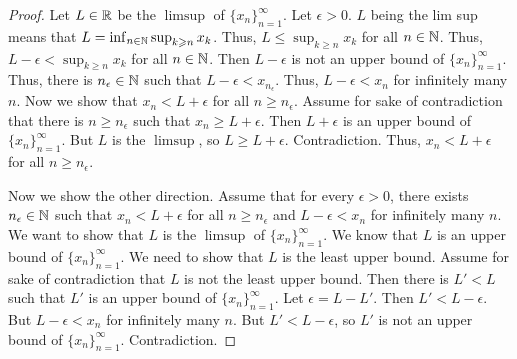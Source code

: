 \documentclass{report}
\begin{document}
\begin{proof}
    Let $L \in \RR$ be the $\limsup$ of $\{x_n\}_{n=1}^\infty$. Let $\epsilon > 0$. $L$ being the lim sup means that $L = \inf_{n \in \NN}\sup_{k \geq n} x_k$. Thus, $L \leq \sup_{k \geq n} x_k$ for all $n \in \NN$. Thus, $L - \epsilon < \sup_{k \geq n} x_k$ for all $n \in \NN$. Then $L - \epsilon$ is not an upper bound of $\{x_n\}_{n=1}^\infty$. Thus, there is $n_\epsilon \in \NN$ such that $L - \epsilon < x_{n_\epsilon}$. Thus, $L - \epsilon < x_n$ for infinitely many $n$. Now we show that $x_n < L + \epsilon$ for all $n \geq n_\epsilon$. Assume for sake of contradiction that there is $n \geq n_\epsilon$ such that $x_n \geq L + \epsilon$. Then $L + \epsilon$ is an upper bound of $\{x_n\}_{n=1}^\infty$. But $L$ is the $\limsup$, so $L \geq L + \epsilon$. Contradiction. Thus, $x_n < L + \epsilon$ for all $n \geq n_\epsilon$.

    Now we show the other direction. Assume that for every $\epsilon > 0$, there exists $n_\epsilon \in \NN$ such that $x_n < L + \epsilon$ for all $n \geq n_\epsilon$ and $L - \epsilon < x_n$ for infinitely many $n$. We want to show that $L$ is the $\limsup$ of $\{x_n\}_{n=1}^\infty$. We know that $L$ is an upper bound of $\{x_n\}_{n=1}^\infty$. We need to show that $L$ is the least upper bound. Assume for sake of contradiction that $L$ is not the least upper bound. Then there is $L' < L$ such that $L'$ is an upper bound of $\{x_n\}_{n=1}^\infty$. Let $\epsilon = L - L'$. Then $L' < L - \epsilon$. But $L - \epsilon < x_n$ for infinitely many $n$. But $L' < L - \epsilon$, so $L'$ is not an upper bound of $\{x_n\}_{n=1}^\infty$. Contradiction.
\end{proof}
\end{document}
